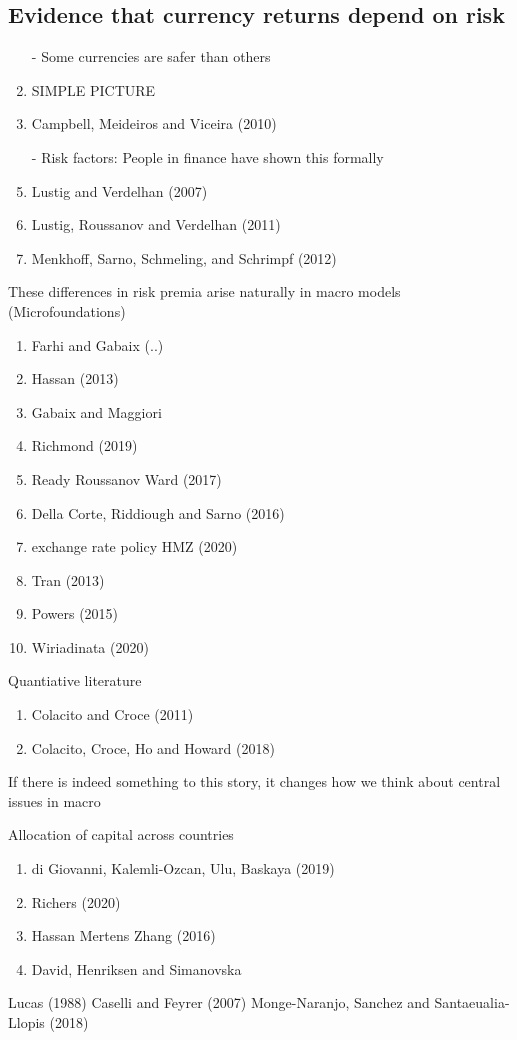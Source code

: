 \documentclass[12pt,letter]{article}
\theoremstyle{break} \theorembodyfont{\normalfont\itshape}
\theoremstyle{break}
\theoremstyle{break} \theorembodyfont{\normalfont\itshape}
\theoremstyle{break} \theorembodyfont{\normalfont\itshape}
\begin{document}
\subsection{Evidence that currency returns depend on risk}
\begin{enumerate}
\item[-] Some currencies are safer than others
\item SIMPLE PICTURE
\item Campbell, Meideiros and Viceira (2010)
\item[-] Risk factors: People in finance have shown this formally
\item Lustig and Verdelhan (2007)
\item Lustig, Roussanov and Verdelhan (2011)
\item Menkhoff, Sarno, Schmeling, and Schrimpf (2012)
\end{enumerate}

These differences in risk premia arise naturally in macro models (Microfoundations)
\begin{enumerate}
    \item Farhi and Gabaix (..)    
    \item Hassan (2013)
    \item Gabaix and Maggiori
     \item Richmond (2019)
    \item Ready Roussanov Ward (2017)  
    \item Della Corte, Riddiough and Sarno (2016)
    \item exchange rate policy HMZ (2020)
    \item Tran (2013)
    \item Powers (2015)
    \item Wiriadinata (2020)
\end{enumerate}

Quantiative literature
    \begin{enumerate}
        \item Colacito and Croce (2011)
        \item Colacito, Croce, Ho and Howard (2018)
    \end{enumerate}


If there is indeed something to this story, it changes how we think about central issues in macro

Allocation of capital across countries
\begin{enumerate}
    \item di Giovanni, Kalemli-Ozcan, Ulu, Baskaya (2019)
    \item Richers (2020)
    \item Hassan Mertens Zhang (2016)
    \item David, Henriksen and Simanovska
\end{enumerate}
Lucas (1988)
Caselli and Feyrer (2007)
Monge-Naranjo, Sanchez and Santaeualia-Llopis (2018)
\end{document}
